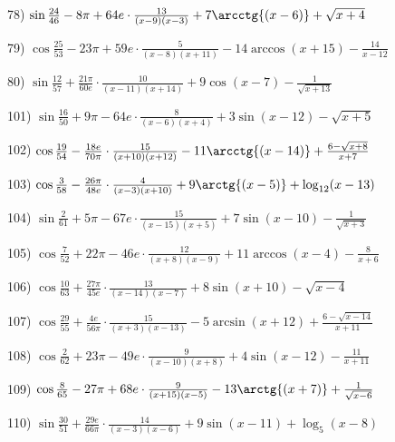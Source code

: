 \documentclass[11pt,ukrainian]{article}
\begin{document}
78) \space 
{ ${\sin\frac{24}{46}} - 8{\pi} + 64 e\cdot {\frac{13}{(x - 9)(x - 3)}} + {7\arcctg{(x - 6)}} + {\sqrt{x + 4}}$}
\smallskip\par
79) \space 
{ ${\cos\frac{25}{53}} - 23{\pi} + 59 e\cdot {\frac{5}{(x - 8)(x + 11)}} - {14\arccos{(x + 15)}} - { \frac{14}{x - 12}}$}
\smallskip\par
80) \space 
{ ${\sin\frac{12}{57}} + \frac{21{\pi}}{60 e}\cdot {\frac{10}{(x - 11)(x + 14)}} + {9\cos{(x - 7)}} - {\frac{1}{\sqrt{x + 13}}}$}
\smallskip\par
101) \space 
{ ${\sin\frac{16}{50}} + 9{\pi} - 64 e\cdot {\frac{8}{(x - 6)(x + 4)}} + {3\sin{(x - 12)}} - {\sqrt{x + 5}}$}
\smallskip\par
102) \space 
{ ${\cos\frac{19}{54}} - \frac{18 e}{70{\pi}}\cdot {\frac{15}{(x + 10)(x + 12)}} - {11\arcctg{(x - 14)}} + {\frac{6 - \sqrt{x + 8}}{x + 7}}$}
\smallskip\par
103) \space 
{ ${\cos\frac{3}{58}} - \frac{26{\pi}}{48 e}\cdot {\frac{4}{(x - 3)(x + 10)}} + {9\arctg{(x - 5)}} + {\log_{12}(x - 13)}$}
\smallskip\par
104) \space 
{ ${\sin\frac{2}{61}} + 5{\pi} - 67 e\cdot {\frac{15}{(x - 15)(x + 5)}} + {7\sin{(x - 10)}} - {\frac{1}{\sqrt{x + 3}}}$}
\smallskip\par
105) \space 
{ ${\cos\frac{7}{52}} + 22{\pi} - 46 e\cdot {\frac{12}{(x + 8)(x - 9)}} + {11\arccos{(x - 4)}} - { \frac{8}{x + 6}}$}
\smallskip\par
106) \space 
{ ${\cos\frac{10}{63}} + \frac{27{\pi}}{45 e}\cdot {\frac{13}{(x - 14)(x - 7)}} + {8\sin{(x + 10)}} - {\sqrt{x - 4}}$}
\smallskip\par
107) \space 
{ ${\cos\frac{29}{55}} + \frac{4 e}{56{\pi}}\cdot {\frac{15}{(x + 3)(x - 13)}} - {5\arcsin{(x + 12)}} + {\frac{6 - \sqrt{x - 14}}{x + 11}}$}
\smallskip\par
108) \space 
{ ${\cos\frac{2}{62}} + 23{\pi} - 49 e\cdot {\frac{9}{(x - 10)(x + 8)}} + {4\sin{(x - 12)}} - { \frac{11}{x + 11}}$}
\smallskip\par
109) \space 
{ ${\cos\frac{8}{65}} - 27{\pi} + 68 e\cdot {\frac{9}{(x + 15)(x - 5)}} - {13\arctg{(x + 7)}} + {\frac{1}{\sqrt{x - 6}}}$}
\smallskip\par
110) \space 
{ ${\sin\frac{30}{51}} + \frac{29 e}{66{\pi}}\cdot {\frac{14}{(x - 3)(x - 6)}} + {9\sin{(x - 11)}} + {\log_{5}(x - 8)}$}
\smallskip\par
\end{document}

